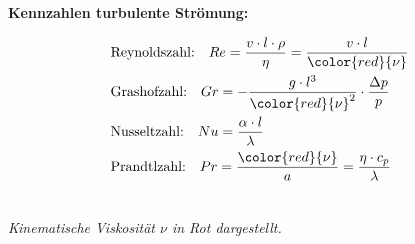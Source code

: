 \begin{minipage}[t]{.45\textwidth}
\vspace*{4mm}
\textbf{Kennzahlen turbulente Strömung:} \par \vspace*{-4mm}
\begin{align*}
&\text{Reynoldszahl:} \quad Re = \frac{v \cdot l \cdot \rho}{\eta} = \frac{v \cdot l}{\color{red}{\nu}}
\\
&\text{Grashofzahl:} \quad Gr = - \frac{g \cdot l^3}{{\color{red}{\nu}}^2} \cdot \frac{\Delta p}{p} \\
&\text{Nusseltzahl:} \quad Nu = \frac{\alpha \cdot l}{\lambda} \\
&\text{Prandtlzahl:} \quad Pr = \frac{{\color{red}{\nu}}}{a} = \frac{\eta \cdot c_p}{\lambda} \\ \\
\end{align*}
\par \vspace*{-8mm}
{\color{red} \textit{Kinematische Viskosität $\nu$ in Rot dargestellt.}}
\end{minipage}\hspace*{8mm}

